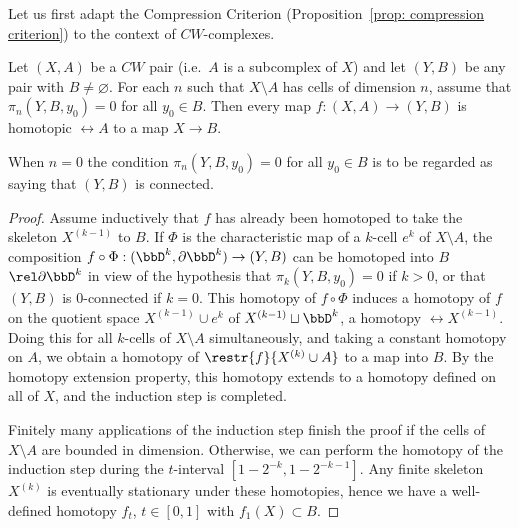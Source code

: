 Let us first adapt the Compression Criterion (Proposition~\ref{prop: compression criterion}) to the context of $CW$-complexes.

\begin{lem}
    Let $(X,A)$ be a $CW$ pair (i.e.~$A$ is a subcomplex of $X$) and let $(Y,B)$ be any pair with $B\neq\varnothing$. For each $n$ such that $X\setminus A$ has cells of dimension $n$, assume that $\pi_n(Y,B,y_0)=0$ for all $y_0\in B$. Then every map $f:(X,A)\to (Y,B)$ is homotopic $\rel A$ to a map $X\to B$.

    When $n=0$ the condition $\pi_n(Y,B,y_0)=0$ for all $y_0\in B$ is to be regarded as saying that $(Y,B)$ is connected.
\end{lem}
\begin{proof}
    Assume inductively that $f$ has already been homotoped to take the skeleton $X^{(k-1)}$ to $B$. If $\Phi$ is the characteristic map of a $k$-cell $e^k$ of $X\setminus A$, the composition $f\circ \Phi:(\bbD^k,\partial \bbD^k)\to (Y,B)$ can be homotoped into $B$ $\rel \partial \bbD^k$ in view of the hypothesis that $\pi_k(Y,B,y_0)=0$ if $k>0$, or that $(Y,B)$ is $0$-connected if $k=0$. This homotopy of $f\circ\Phi$ induces a homotopy of $f$ on the quotient space $X^{(k-1)}\cup e^k$ of $X^{(k-1)}\sqcup \bbD^k$, a homotopy $\rel X^{(k-1)}$. Doing this for all $k$-cells of $X\setminus A$ simultaneously, and taking a constant homotopy on $A$, we obtain a homotopy of $\restr{f}{X^{(k)}\cup A}$ to a map into $B$. By the homotopy extension property, this homotopy extends to a homotopy defined on all of $X$, and the induction step is completed.

    Finitely many applications of the induction step finish the proof if the cells of $X\setminus A$ are bounded in dimension. Otherwise, we can perform the homotopy of the induction step during the $t$-interval $[1-2^{-k},1-2^{-k-1}]$. Any finite skeleton $X^{(k)}$ is eventually stationary under these homotopies, hence we have a well-defined homotopy $f_t$, $t\in [0,1]$ with $f_1(X)\subset B$.
\end{proof}


